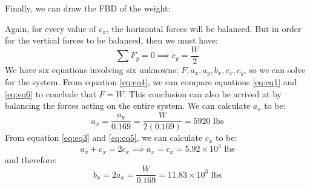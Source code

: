 \documentclass{article}
\begin{document}
Finally, we can draw the FBD of the weight:
\begin{center}
\end{center}
Again, for every value of $c_x$, the horizontal forces will be balanced. But in order for the vertical forces to be balanced, then we must have:
\begin{equation}
    \sum F_y=0 \implies c_y = \frac{W}{2}
    \label{eq:eq6}
\end{equation}
We have six equations involving six unknowns: $F,a_x,a_y,b_x,c_x,c_y$, so we can solve for the system. From equation \ref{eq:eq4}, we can compare equations \ref{eq:eq1} and \ref{eq:eq6} to conclude that $F=W$. This conclusion can also be arrived at by balancing the forces acting on the entire system. We can calculate $a_x$ to be:
\begin{equation}
    a_x = \frac{a_y}{0.169}=\frac{W}{2(0.169)} = 5920 \text{ lbs}
    \label{eq:}
\end{equation}
From equation \ref{eq:eq3} and \ref{eq:eq5}, we can calculate $c_x$ to be:
\begin{equation}
    a_x+c_x=2c_x \implies a_x=\boxed{c_x=5.92 \times 10^3 \text{ lbs}}
    \label{eq:}
\end{equation}
and therefore:
\begin{equation}
    b_x = 2a_x = \frac{W}{0.169} = \boxed{11.83 \times 10^3 \text{ lbs}}
    \label{eq:}
\end{equation}
\end{document}
